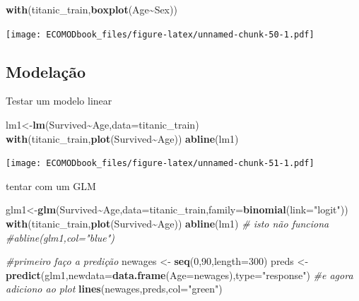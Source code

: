 \documentclass[
]{book}
\newenvironment{Shaded}{\begin{snugshade}}{\end{snugshade}}
\newcommand{\AttributeTok}[1]{\textcolor[rgb]{0.13,0.29,0.53}{#1}}
\newcommand{\CommentTok}[1]{\textcolor[rgb]{0.56,0.35,0.01}{\textit{#1}}}
\newcommand{\DecValTok}[1]{\textcolor[rgb]{0.00,0.00,0.81}{#1}}
\newcommand{\FunctionTok}[1]{\textcolor[rgb]{0.13,0.29,0.53}{\textbf{#1}}}
\newcommand{\NormalTok}[1]{#1}
\newcommand{\OtherTok}[1]{\textcolor[rgb]{0.56,0.35,0.01}{#1}}
\newcommand{\SpecialCharTok}[1]{\textcolor[rgb]{0.81,0.36,0.00}{\textbf{#1}}}
\newcommand{\StringTok}[1]{\textcolor[rgb]{0.31,0.60,0.02}{#1}}
\begin{document}
\begin{Shaded}
\begin{Highlighting}[]
\FunctionTok{with}\NormalTok{(titanic\_train,}\FunctionTok{boxplot}\NormalTok{(Age}\SpecialCharTok{\textasciitilde{}}\NormalTok{Sex))}
\end{Highlighting}
\end{Shaded}

\texttt{[image: ECOMODbook\_files/figure-latex/unnamed-chunk-50-1.pdf]}

\subsection{Modelação}\label{modelauxe7uxe3o}

Testar um modelo linear

\begin{Shaded}
\begin{Highlighting}[]
\NormalTok{lm1}\OtherTok{\textless{}{-}}\FunctionTok{lm}\NormalTok{(Survived}\SpecialCharTok{\textasciitilde{}}\NormalTok{Age,}\AttributeTok{data=}\NormalTok{titanic\_train)}
\FunctionTok{with}\NormalTok{(titanic\_train,}\FunctionTok{plot}\NormalTok{(Survived}\SpecialCharTok{\textasciitilde{}}\NormalTok{Age))}
\FunctionTok{abline}\NormalTok{(lm1)}
\end{Highlighting}
\end{Shaded}

\texttt{[image: ECOMODbook\_files/figure-latex/unnamed-chunk-51-1.pdf]}

tentar com um GLM

\begin{Shaded}
\begin{Highlighting}[]
\NormalTok{glm1}\OtherTok{\textless{}{-}}\FunctionTok{glm}\NormalTok{(Survived}\SpecialCharTok{\textasciitilde{}}\NormalTok{Age,}\AttributeTok{data=}\NormalTok{titanic\_train,}\AttributeTok{family=}\FunctionTok{binomial}\NormalTok{(}\AttributeTok{link=}\StringTok{"logit"}\NormalTok{))}
\FunctionTok{with}\NormalTok{(titanic\_train,}\FunctionTok{plot}\NormalTok{(Survived}\SpecialCharTok{\textasciitilde{}}\NormalTok{Age))}
\FunctionTok{abline}\NormalTok{(lm1)}
\CommentTok{\# isto não funciona}
\CommentTok{\#abline(glm1,col="blue")}

\CommentTok{\#primeiro faço a predição}
\NormalTok{newages }\OtherTok{\textless{}{-}} \FunctionTok{seq}\NormalTok{(}\DecValTok{0}\NormalTok{,}\DecValTok{90}\NormalTok{,}\AttributeTok{length=}\DecValTok{300}\NormalTok{)}
\NormalTok{preds }\OtherTok{\textless{}{-}} \FunctionTok{predict}\NormalTok{(glm1,}\AttributeTok{newdata=}\FunctionTok{data.frame}\NormalTok{(}\AttributeTok{Age=}\NormalTok{newages),}\AttributeTok{type=}\StringTok{"response"}\NormalTok{)}
\CommentTok{\#e agora adiciono ao plot}
\FunctionTok{lines}\NormalTok{(newages,preds,}\AttributeTok{col=}\StringTok{"green"}\NormalTok{)}
\end{Highlighting}
\end{Shaded}
\end{document}
